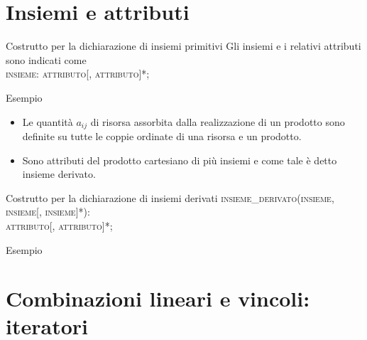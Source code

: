 \documentclass{beamer}
\newcommand{\noun}[1]{\textsc{#1}}
\def\lyxframeend{} %
\begin{document}
\lyxframeend{}\section{Insiemi e attributi}


\lyxframeend{}

\begin{block}{Costrutto per la dichiarazione di insiemi primitivi}
Gli insiemi e i relativi attributi sono indicati come \\

\noun{insieme}: \noun{attributo}{[},\noun{ attributo}{]}{*};
\end{block}

\begin{exampleblock}{Esempio}
\\
\end{exampleblock}

\lyxframeend{}

\begin{itemize}
\item Le quantit\`a $a_{ij}$ di risorsa assorbita dalla realizzazione
di un prodotto sono definite su tutte le coppie ordinate di una risorsa
e un prodotto.
\item Sono attributi del prodotto cartesiano di pi\`u insiemi e come tale
\`e detto insieme derivato.
\end{itemize}

\begin{block}{Costrutto per la dichiarazione di insiemi derivati}
 \noun{insieme\_derivato}(\noun{insieme}, \noun{insieme}{[}, \noun{insieme}{]}{*}):\\
\noun{attributo}{[}, \noun{attributo}{]}{*};
\end{block}

\begin{exampleblock}{Esempio}
\end{exampleblock}

\lyxframeend{}\section{Combinazioni lineari e vincoli: iteratori}
\end{document}
